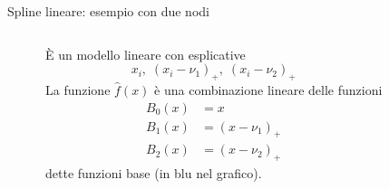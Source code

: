 \documentclass{beamer}\usepackage[]{graphicx}\usepackage[]{color}
\makeatletter
\newenvironment{kframe}{%
 \def\at@end@of@kframe{}%
 \ifinner\ifhmode%
  \def\at@end@of@kframe{\end{minipage}}%
  \begin{minipage}{\columnwidth}%
 \fi\fi%
 \def\FrameCommand##1{\hskip\@totalleftmargin \hskip-\fboxsep
 \colorbox{shadecolor}{##1}\hskip-\fboxsep
     \hskip-\linewidth \hskip-\@totalleftmargin \hskip\columnwidth}%
 \MakeFramed {\advance\hsize-\width
   \@totalleftmargin\z@ \linewidth\hsize
   \@setminipage}}%
 {\par\unskip\endMakeFramed%
 \at@end@of@kframe}
\newenvironment{knitrout}{}{} %
\makeatother
\begin{document}
\begin{frame}{Spline lineare: esempio con due nodi}
{\begin{columns}
\begin{knitrout}
\color{fgcolor}\begin{kframe}


{\ttfamily\noindent\bfseries{}}

{\ttfamily\noindent\bfseries{}}\end{kframe}
\end{knitrout}

\`E un modello lineare con esplicative
\[ x_i,\;(x_i-\nu_1)_+,\;(x_i-\nu_2)_+ \]
La funzione $\hat{f}(x)$ \`e una combinazione lineare delle funzioni 
\begin{align*}
B_0(x) &=x\\ 
B_1(x) &=(x-\nu_1)_+\\
B_2(x) &=(x-\nu_2)_+ 
\end{align*}
dette funzioni base (in blu nel grafico).
\end{columns}
}
\end{frame}
\end{document}
